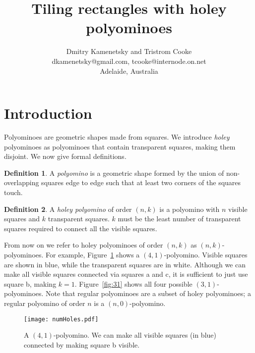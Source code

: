 \documentclass[10pt,a4paper]{article}
\theoremstyle{definition}
\newtheorem{defn}{Definition}[section]
\begin{document}
\title{Tiling rectangles with holey polyominoes}

\author{Dmitry Kamenetsky and Tristrom Cooke \\
dkamenetsky@gmail.com, tcooke@internode.on.net \\
Adelaide, Australia
}


\maketitle



\section{Introduction}

Polyominoes are geometric shapes made from squares.
We introduce \emph{holey} polyominoes as polyominoes that contain transparent squares, making them disjoint.
We now give formal definitions.

\begin{defn}
A \emph{polyomino} is a geometric shape formed by the union of non-overlapping squares edge to edge such that at least two
corners of the squares touch.
\end{defn}

\begin{defn}
A \emph{holey polyomino} of order $(n,k)$ is a polyomino with $n$ visible squares and $k$ transparent squares.
$k$ must be the least number of transparent squares required to connect all the visible squares.
\end{defn}

From now on we refer to holey polyominoes of order $(n,k)$ as $(n,k)$-polyominoes.
For example, Figure~\ref{fig:numHoles} shows a $(4,1)$-polyomino.
Visible squares are shown in blue, while the
transparent squares are in white. 
Although we can make all visible squares connected
via squares a and c, it is sufficient to just use square b, making $k=1$.
Figure~\ref{fig:31} shows all four possible $(3,1)$-polyominoes.
Note that regular polyominoes are a subset of holey polyominoes; a regular polyomino of order $n$ is a
$(n,0)$-polyomino.

\begin{figure}[!htpb]
\centering
\texttt{[image: numHoles.pdf]}
\caption{A $(4,1)$-polyomino. We can make all visible squares (in blue) connected by making square b visible.}
\label{fig:numHoles}
\end{figure}
\end{document}
